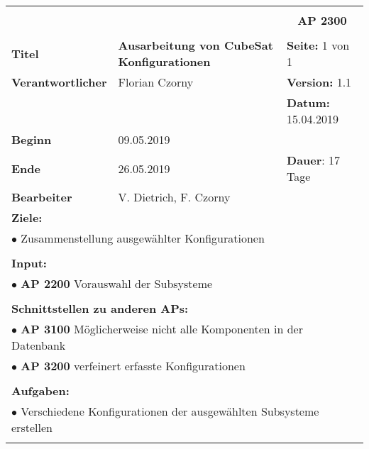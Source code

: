 \clearpage
\begin{table}[!h]
 \begin{center}
  \begin{tabular}{|p{35mm}||p{55mm}|p{50mm}||p{40mm}|}
   \hline
   \multicolumn{3}{|l||}{\textbf{}} & \multicolumn{1}{c|}{}\\
   \multicolumn{3}{|l||}{\textbf{}} & \multicolumn{1}{c|}{\textbf{AP 2300}}\\
   \multicolumn{3}{|l||}{\textbf{}} & \multicolumn{1}{c|}{}\\
   \hline\hline
   \textbf{Titel} & \multicolumn{2}{p{7cm}||}{\textbf{Ausarbeitung von CubeSat Konfigurationen}} & \textbf{Seite:} 1 von 1\\
   \hline
   \textbf{Verantwortlicher} & \multicolumn{2}{l||}{Florian Czorny} & \textbf{Version:} 1.1\\
   \hline
   \multicolumn{3}{|l||}{} & \textbf{Datum:} 15.04.2019\\
   \hline\hline
   \textbf{Beginn} & \multicolumn{2}{l||}{09.05.2019} & \\
   \hline
   \textbf{Ende} & \multicolumn{2}{l||}{26.05.2019} & \textbf{Dauer}: 17 Tage\\
   \hline\hline
   \textbf{Bearbeiter} & \multicolumn{3}{l|}{V. Dietrich, F. Czorny}\\
   \hline\hline
   \multicolumn{4}{|p{150mm}|}{\textbf{Ziele:}}\\
   \multicolumn{4}{|p{150mm}|}{$\bullet$ Zusammenstellung ausgewählter Konfigurationen}\\
   \multicolumn{4}{|p{150mm}|}{}\\
   \multicolumn{4}{|p{150mm}|}{\textbf{Input:}}\\
   \multicolumn{4}{|p{150mm}|}{$\bullet$ \textbf{AP 2200} Vorauswahl der Subsysteme}\\
   \multicolumn{4}{|p{150mm}|}{}\\
   \multicolumn{4}{|p{150mm}|}{\textbf{Schnittstellen zu anderen APs:}}\\
   \multicolumn{4}{|p{150mm}|}{$\bullet$ \textbf{AP 3100} Möglicherweise nicht alle Komponenten in der Datenbank}\\
   \multicolumn{4}{|p{150mm}|}{$\bullet$ \textbf{AP 3200} verfeinert erfasste Konfigurationen}\\
   \multicolumn{4}{|p{150mm}|}{}\\
   \multicolumn{4}{|p{150mm}|}{\textbf{Aufgaben:}}\\
   \multicolumn{4}{|p{150mm}|}{$\bullet$ Verschiedene Konfigurationen der ausgewählten Subsysteme erstellen}\\
   \multicolumn{4}{|p{150mm}|}{}\\
   \hline
  \end{tabular}
 \end{center}
\end{table}

